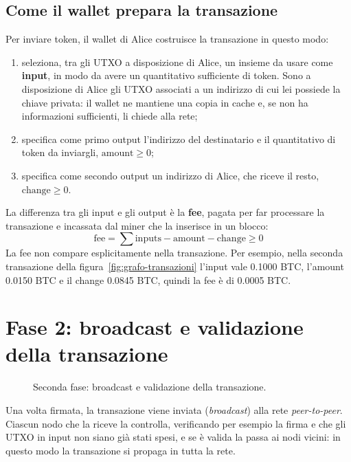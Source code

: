 \documentclass[a4paper, 11pt, oneside]{book}
\begin{document}
	\subsection{Come il wallet prepara la transazione}
	Per inviare token, il wallet di Alice costruisce la transazione in questo modo:
	\begin{enumerate}
		\item seleziona, tra gli UTXO a disposizione di Alice, un insieme da usare come
			\textbf{input}, in modo da avere un quantitativo sufficiente di token. Sono a
			disposizione di Alice gli UTXO associati a un indirizzo di cui lei possiede la
			chiave privata: il wallet ne mantiene una copia in cache e, se non ha
			informazioni sufficienti, li chiede alla rete;
		\item specifica come primo output l'indirizzo del destinatario e il quantitativo
			di token da inviargli, $\text{amount} \ge 0$;
		\item specifica come secondo output un indirizzo di Alice, che riceve il resto,
			$\text{change} \ge 0$.
	\end{enumerate}
	La differenza tra gli input e gli output è la \textbf{fee}, pagata per far processare
	la transazione e incassata dal miner che la inserisce in un blocco:
	\[
		\text{fee} = \sum \text{inputs} - \text{amount} - \text{change} \ge 0
	\]
	La fee non compare esplicitamente nella transazione. Per esempio, nella seconda
	transazione della figura~\ref{fig:grafo-transazioni} l'input vale 0.1000 BTC,
	l'amount 0.0150 BTC e il change 0.0845 BTC, quindi la fee è di 0.0005 BTC.

	\section{Fase 2: broadcast e validazione della transazione}
	\begin{figure}[H]
		\centering
		\caption{Seconda fase: broadcast e validazione della transazione.}
		\label{fig:ciclo-vita-fase2}
	\end{figure}

	Una volta firmata, la transazione viene inviata (\textit{broadcast}) alla rete
	\textit{peer-to-peer}. Ciascun nodo che la riceve la controlla, verificando per
	esempio la firma e che gli UTXO in input non siano già stati spesi, e se è valida
	la passa ai nodi vicini: in questo modo la transazione si propaga in tutta la rete.
\end{document}
